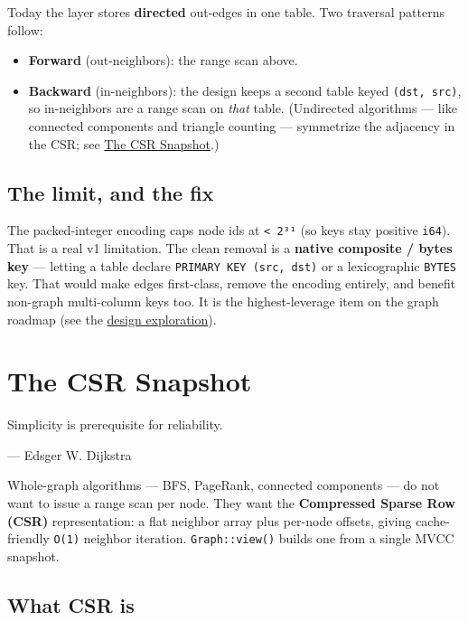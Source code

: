 \documentclass[
  11pt,
  openany]{book}
\providecommand{\tightlist}{%
  \setlength{\itemsep}{0pt}\setlength{\parskip}{0pt}}
\begin{document}
Today the layer stores \textbf{directed} out-edges in one table. Two
traversal patterns follow:

\begin{itemize}
\tightlist
\item
  \textbf{Forward} (out-neighbors): the range scan above.
\item
  \textbf{Backward} (in-neighbors): the design keeps a second table
  keyed \texttt{(dst,\ src)}, so in-neighbors are a range scan on
  \emph{that} table. (Undirected algorithms --- like connected
  components and triangle counting --- symmetrize the adjacency in the
  CSR; see \href{snapshot.md}{The CSR Snapshot}.)
\end{itemize}

\section{The limit, and the fix}\label{the-limit-and-the-fix}

The packed-integer encoding caps node ids at \texttt{\textless{}\ 2³¹}
(so keys stay positive \texttt{i64}). That is a real v1 limitation. The
clean removal is a \textbf{native composite / bytes key} --- letting a
table declare \texttt{PRIMARY\ KEY\ (src,\ dst)} or a lexicographic
\texttt{BYTES} key. That would make edges first-class, remove the
encoding entirely, and benefit non-graph multi-column keys too. It is
the highest-leverage item on the graph roadmap (see the
\href{../../../graph-exploration.md}{design exploration}).

\chapter{The CSR Snapshot}\label{the-csr-snapshot}

\epigraph{Simplicity is prerequisite for reliability.}{--- Edsger W. Dijkstra}

Whole-graph algorithms --- BFS, PageRank, connected components --- do
not want to issue a range scan per node. They want the
\textbf{Compressed Sparse Row (CSR)} representation: a flat neighbor
array plus per-node offsets, giving cache-friendly \texttt{O(1)}
neighbor iteration. \texttt{Graph::view()} builds one from a single MVCC
snapshot.

\section{What CSR is}\label{what-csr-is}
\end{document}
